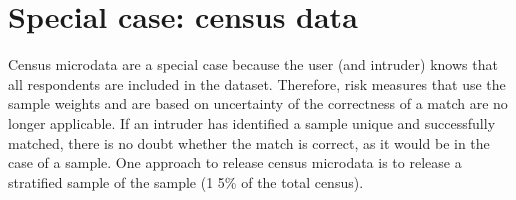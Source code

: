 \documentclass[letterpaper,10pt,english]{sphinxmanual}
\begin{document}
\section{Special case: census data}
\label{\detokenize{anon_methods:special-case-census-data}}
Census microdata are a special case because the user (and intruder)
knows that all respondents are included in the dataset. Therefore, risk
measures that use the sample weights and are based on uncertainty of the
correctness of a match are no longer applicable. If an intruder has
identified a sample unique and successfully matched, there is no doubt
whether the match is correct, as it would be in the case of a sample.
One approach to release census microdata is to release a stratified
sample of the sample (1 \textendash{} 5\% of the total census). 
\end{document}
